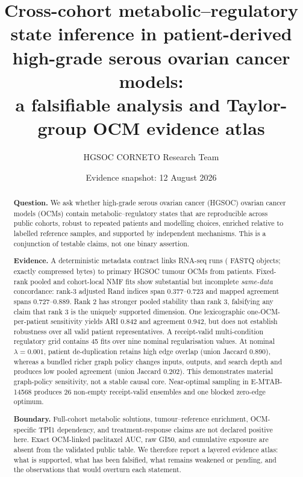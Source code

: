 \documentclass[10pt]{article}
\title{Cross-cohort metabolic--regulatory state inference in patient-derived\\
high-grade serous ovarian cancer models:\\
a falsifiable analysis and Taylor-group OCM evidence atlas}
\author{HGSOC CORNETO Research Team}
\date{Evidence snapshot: 12 August 2026}
\begin{document}
\maketitle

\begin{abstract}
\textbf{Question.} We ask whether high-grade serous ovarian cancer (HGSOC)
ovarian cancer models (OCMs) contain metabolic--regulatory states that are
reproducible across public cohorts, robust to repeated patients and modelling
choices, enriched relative to labelled reference samples, and supported by
independent mechanisms.  This is a conjunction of testable claims, not one
binary assertion.

\textbf{Evidence.} A deterministic metadata contract links \ManifestRunCount{}
RNA-seq runs (\FastqObjectCount{} FASTQ objects; exactly \FastqByteCount{}
compressed bytes) to \PrimaryOCMCount{} primary HGSOC tumour OCMs from
\PrimaryPatientCount{} patients.  Fixed-rank pooled and cohort-local NMF fits
show substantial but incomplete \emph{same-data} concordance: rank-3 adjusted
Rand indices span 0.377--0.723 and mapped agreement spans 0.727--0.889.  Rank 2
has stronger pooled stability than rank 3, falsifying any claim that rank 3 is
the uniquely supported dimension.  One lexicographic one-OCM-per-patient
sensitivity yields ARI 0.842 and agreement 0.942, but does not establish
robustness over all valid patient representatives.  A receipt-valid
multi-condition regulatory grid contains 45 fits over nine nominal
regularisation values.  At nominal $\lambda=0.001$, patient de-duplication
retains high edge overlap (union Jaccard 0.890), whereas a bundled richer graph
policy changes inputs, outputs, and search depth and produces low pooled
agreement (union Jaccard 0.202).  This demonstrates material graph-policy
sensitivity, not a stable causal core.  Near-optimal sampling in E-MTAB-14568
produces 26 non-empty receipt-valid ensembles and one blocked zero-edge
optimum.

\textbf{Boundary.} Full-cohort metabolic solutions, tumour--reference
enrichment, OCM-specific TPI1 dependency, and treatment-response claims are not
declared positive here.  Exact OCM-linked paclitaxel AUC, raw GI50, and
cumulative exposure are absent from the validated public table.  We therefore
report a layered evidence atlas: what is supported, what has been falsified,
what remains weakened or pending, and the observations that would overturn
each statement.
\end{abstract}

\end{document}
